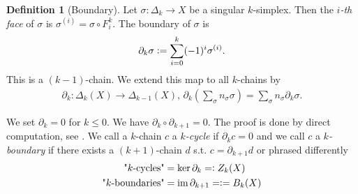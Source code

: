 \documentclass[12pt,a4paper]{article}
\theoremstyle{definition}
\newtheorem{definition}{Definition}
\newcommand{\real}{\mathbb{R}}
\begin{document}
\begin{definition}[Boundary]
    Let $\sigma: \Delta_k \rightarrow X$ be a singular $k$-simplex. Then the 
    \textit{$i$-th face} of $\sigma$ is $\sigma^{(i)}=\sigma \circ F_i^k$.
    The boundary of $\sigma$ is 
    \begin{align*}
        \partial_k \sigma \vcentcolon= \sum\limits_{i=0}^k (-1)^i \sigma^{(i)}.
    \end{align*}
    This is a $(k-1)$-chain. We extend this map to all $k$-chains by
    \begin{align*}
        \partial_k: \Delta_k(X) \rightarrow \Delta_{k-1}(X),\,
        \partial_k(\sum_\sigma n_\sigma \sigma) = 
        \sum_\sigma n_\sigma \partial_k\sigma.
    \end{align*}
\end{definition}

We set $\partial_k = 0$ for $k\leq 0$. 
We have $\partial_k \circ \partial_{k+1} = 0$. The proof is done by direct 
computation, see
\cite[Ch.\,4, Lemma 1.6]{topology_and_geometry}.
We call a $k$-chain $c$ a \textit{$k$-cycle} if $\partial_k c = 0$ 
and we call $c$ 
a \textit{$k$-boundary} if there exists a $(k+1)$-chain $d$ s.t. 
$c = \partial_{k+1} d$ or phrased differently
\begin{align*}
    \text{"$k$-cycles"} &= \text{ker}\,\partial_k =\vcentcolon Z_k(X) \\
    \text{"$k$-boundaries"} &= \text{im}\,\partial_{k+1} =\vcentcolon= B_k(X)
\end{align*}






\end{document}
